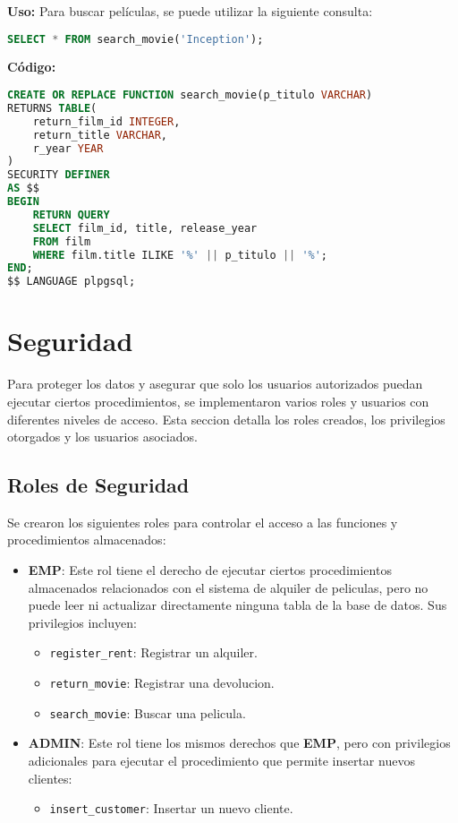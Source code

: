 \documentclass{article}
\begin{document}
\textbf{Uso:}
Para buscar películas, se puede utilizar la siguiente consulta:

\begin{lstlisting}[language=SQL]
SELECT * FROM search_movie('Inception');
\end{lstlisting}

\textbf{Código:}
\begin{lstlisting}[language=SQL]
CREATE OR REPLACE FUNCTION search_movie(p_titulo VARCHAR)
RETURNS TABLE(
    return_film_id INTEGER,      
    return_title VARCHAR,        
    r_year YEAR                  
) 
SECURITY DEFINER
AS $$
BEGIN
    RETURN QUERY
    SELECT film_id, title, release_year  
    FROM film  
    WHERE film.title ILIKE '%' || p_titulo || '%';  
END;
$$ LANGUAGE plpgsql;
\end{lstlisting}

\section{Seguridad}

Para proteger los datos y asegurar que solo los usuarios autorizados puedan ejecutar ciertos procedimientos, se implementaron varios roles y usuarios con diferentes niveles de acceso. Esta seccion detalla los roles creados, los privilegios otorgados y los usuarios asociados.

\subsection{Roles de Seguridad}

Se crearon los siguientes roles para controlar el acceso a las funciones y procedimientos almacenados:

\begin{itemize}
    \item \textbf{EMP}: Este rol tiene el derecho de ejecutar ciertos procedimientos almacenados relacionados con el sistema de alquiler de peliculas, pero no puede leer ni actualizar directamente ninguna tabla de la base de datos. Sus privilegios incluyen:
    \begin{itemize}
        \item \texttt{register\_rent}: Registrar un alquiler.
        \item \texttt{return\_movie}: Registrar una devolucion.
        \item \texttt{search\_movie}: Buscar una pelicula.
    \end{itemize}

    \item \textbf{ADMIN}: Este rol tiene los mismos derechos que \textbf{EMP}, pero con privilegios adicionales para ejecutar el procedimiento que permite insertar nuevos clientes:
    \begin{itemize}
        \item \texttt{insert\_customer}: Insertar un nuevo cliente.
    \end{itemize}
\end{itemize}
\end{document}

